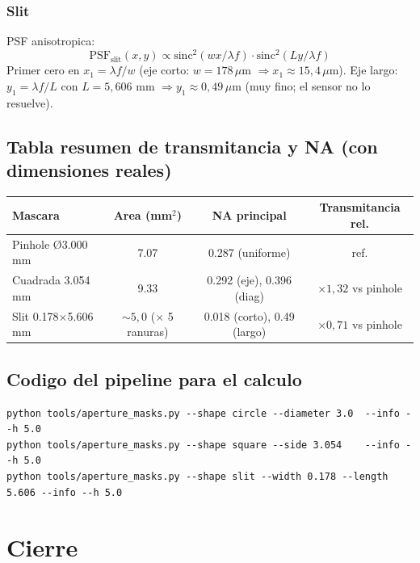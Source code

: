 \documentclass[11pt,a4paper,oneside]{report}
\begin{document}
\subsection{Slit}
PSF anisotropica:
\[
\mathrm{PSF}_{\text{slit}}(x,y) \propto \mathrm{sinc}^2(w x / \lambda f) \cdot \mathrm{sinc}^2(L y / \lambda f)
\]
Primer cero en $x_1 = \lambda f / w$ (eje corto: $w = 178\,\mu$m $\Rightarrow x_1 \approx 15{,}4\,\mu$m).
Eje largo: $y_1 = \lambda f / L$ con $L = 5{,}606$ mm $\Rightarrow y_1 \approx 0{,}49\,\mu$m
(muy fino; el sensor no lo resuelve).

\section{Tabla resumen de transmitancia y NA (con dimensiones reales)}

\begin{center}
\begin{tabular}{lccc}
\toprule
\textbf{Mascara} & \textbf{Area (mm$^2$)} & \textbf{NA principal} & \textbf{Transmitancia rel.} \\
\midrule
Pinhole Ø3.000 mm  & 7.07  & 0.287 (uniforme)        & ref. \\
Cuadrada 3.054 mm  & 9.33  & 0.292 (eje), 0.396 (diag) & $\times 1{,}32$ vs pinhole \\
Slit 0.178$\times$5.606 mm & $\sim 5{,}0$ ($\times$ 5 ranuras) & 0.018 (corto), 0.49 (largo) & $\times 0{,}71$ vs pinhole \\
\bottomrule
\end{tabular}
\end{center}

\section{Codigo del pipeline para el calculo}

\begin{verbatim}
python tools/aperture_masks.py --shape circle --diameter 3.0  --info --h 5.0
python tools/aperture_masks.py --shape square --side 3.054    --info --h 5.0
python tools/aperture_masks.py --shape slit --width 0.178 --length 5.606 --info --h 5.0
\end{verbatim}

\chapter*{Cierre}
\end{document}
